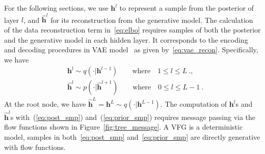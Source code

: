 \documentclass{article}
\begin{document}
For the following sections, we use $\mathbf{h}^l$ to represent a sample from the posterior of layer $l$, and $\widehat{\mathbf{h}}^l$ for its reconstruction from the generative model. 
The calculation of the data reconstruction term in~\eqref{eq:elbo} requires  samples of both the posterior and the  generative model  in each hidden layer. It corresponds to the encoding and decoding procedures in VAE model~\cite{kingma2013auto} as given by~\eqref{eq:vae_recon}. Specifically, we have
\begin{align} \label{eq:post_smp}
 &\mathbf{h}^l \sim q(\cdot | \mathbf{h}^{l-1})  \quad \quad \textrm{where} \quad 1\leqslant l \leqslant L \ ., \\  \label{eq:prior_smp}
 &\widehat{\mathbf{h}}^l \sim p(\cdot | \widehat{\mathbf{h}}^{l+1}) \quad \quad \textrm{where} \quad 0\leqslant l \leqslant L-1 \ .
 \end{align}
At the root node,  we have $\widehat{\mathbf{h}}^L=\mathbf{h}^L \sim q(\cdot | \mathbf{h}^{L-1}) $.  The computation of $ \mathbf{h}^l$s and $\widehat{\mathbf{h}}^l$s with~(\ref{eq:post_smp}) and~(\ref{eq:prior_smp}) requires   message passing via the flow functions shown in Figure~\ref{fig:tree_message}. A VFG is a deterministic model, samples in both~\eqref{eq:post_smp} and~\eqref{eq:prior_smp}  are directly generative with flow functions.
\end{document}
